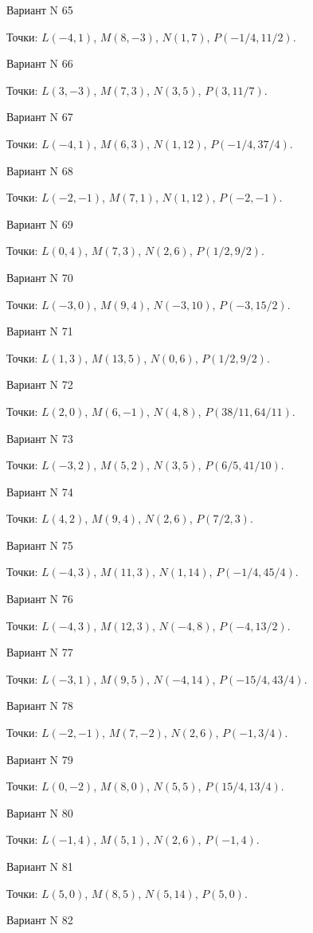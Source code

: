 \documentclass[11pt]{report}
\begin{document}
Вариант N 65

Точки: $L(-4, 1)$, $M(8, -3)$, $N(1, 7)$, $P(-1/4, 11/2)$.

Вариант N 66

Точки: $L(3, -3)$, $M(7, 3)$, $N(3, 5)$, $P(3, 11/7)$.

Вариант N 67

Точки: $L(-4, 1)$, $M(6, 3)$, $N(1, 12)$, $P(-1/4, 37/4)$.

Вариант N 68

Точки: $L(-2, -1)$, $M(7, 1)$, $N(1, 12)$, $P(-2, -1)$.

Вариант N 69

Точки: $L(0, 4)$, $M(7, 3)$, $N(2, 6)$, $P(1/2, 9/2)$.

Вариант N 70

Точки: $L(-3, 0)$, $M(9, 4)$, $N(-3, 10)$, $P(-3, 15/2)$.

Вариант N 71

Точки: $L(1, 3)$, $M(13, 5)$, $N(0, 6)$, $P(1/2, 9/2)$.

Вариант N 72

Точки: $L(2, 0)$, $M(6, -1)$, $N(4, 8)$, $P(38/11, 64/11)$.

Вариант N 73

Точки: $L(-3, 2)$, $M(5, 2)$, $N(3, 5)$, $P(6/5, 41/10)$.

Вариант N 74

Точки: $L(4, 2)$, $M(9, 4)$, $N(2, 6)$, $P(7/2, 3)$.

Вариант N 75

Точки: $L(-4, 3)$, $M(11, 3)$, $N(1, 14)$, $P(-1/4, 45/4)$.

Вариант N 76

Точки: $L(-4, 3)$, $M(12, 3)$, $N(-4, 8)$, $P(-4, 13/2)$.

Вариант N 77

Точки: $L(-3, 1)$, $M(9, 5)$, $N(-4, 14)$, $P(-15/4, 43/4)$.

Вариант N 78

Точки: $L(-2, -1)$, $M(7, -2)$, $N(2, 6)$, $P(-1, 3/4)$.

Вариант N 79

Точки: $L(0, -2)$, $M(8, 0)$, $N(5, 5)$, $P(15/4, 13/4)$.

Вариант N 80

Точки: $L(-1, 4)$, $M(5, 1)$, $N(2, 6)$, $P(-1, 4)$.

Вариант N 81

Точки: $L(5, 0)$, $M(8, 5)$, $N(5, 14)$, $P(5, 0)$.

Вариант N 82
\end{document}
